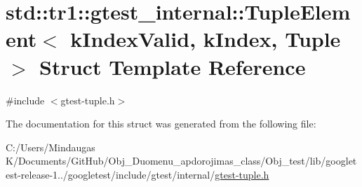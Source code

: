 \hypertarget{structstd_1_1tr1_1_1gtest__internal_1_1_tuple_element}{}\section{std\+::tr1\+::gtest\+\_\+internal\+::Tuple\+Element$<$ k\+Index\+Valid, k\+Index, Tuple $>$ Struct Template Reference}
\label{structstd_1_1tr1_1_1gtest__internal_1_1_tuple_element}


{\ttfamily \#include $<$gtest-\/tuple.\+h$>$}



The documentation for this struct was generated from the following file\+:\begin{DoxyCompactItemize}
\item 
C\+:/\+Users/\+Mindaugas K/\+Documents/\+Git\+Hub/\+Obj\+\_\+\+Duomenu\+\_\+apdorojimas\+\_\+class/\+Obj\+\_\+test/lib/googletest-\/release-\/1../googletest/include/gtest/internal/\mbox{\hyperlink{gtest-tuple_8h}{gtest-\/tuple.\+h}}\end{DoxyCompactItemize}
